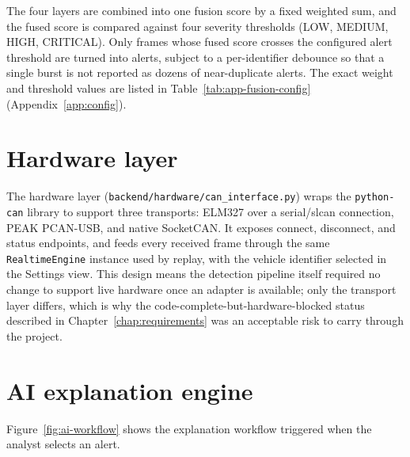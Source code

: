 The four layers are combined into one fusion score by a fixed weighted sum, and the fused score is compared against four severity thresholds (LOW, MEDIUM, HIGH, CRITICAL). Only frames whose fused score crosses the configured alert threshold are turned into alerts, subject to a per-identifier debounce so that a single burst is not reported as dozens of near-duplicate alerts. The exact weight and threshold values are listed in Table~\ref{tab:app-fusion-config} (Appendix~\ref{app:config}).

\section{Hardware layer}

The hardware layer (\texttt{backend/hardware/can\_interface.py}) wraps the \texttt{python-can} library to support three transports: ELM327 over a serial/slcan connection, PEAK PCAN-USB, and native SocketCAN. It exposes connect, disconnect, and status endpoints, and feeds every received frame through the same \texttt{RealtimeEngine} instance used by replay, with the vehicle identifier selected in the Settings view. This design means the detection pipeline itself required no change to support live hardware once an adapter is available; only the transport layer differs, which is why the code-complete-but-hardware-blocked status described in Chapter~\ref{chap:requirements} was an acceptable risk to carry through the project.

\section{AI explanation engine}
\label{sec:design-ai}

Figure~\ref{fig:ai-workflow} shows the explanation workflow triggered when the analyst selects an alert.


